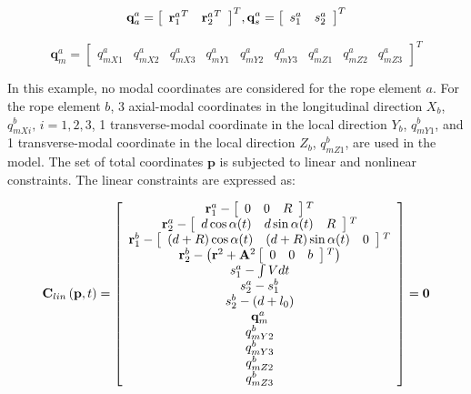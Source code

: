 \begin{equation}
  {\textbf{q}}_a^{a} = {\left[ {\begin{array}{*{20}{c}}{{{\bf{r}}_1^{a}}^T}&{{{\bf{r}}_2^{a}}^T} \end{array}} \right]^T},     {\bf{q}}_s^{a} = {\left[ {\begin{array}{*{20}{c}}{{s_1^a}}&{{s_2^a}}\end{array}} \right]^T}  
\end{equation}

\begin{equation}
    {\textbf{q}}_m^{a} = \left[ {\begin{array}{*{20}{c}}{{q_{mX1}^a}}&{{q_{mX2}^a}} &{{q_{mX3}^a}}&{{q_{mY1}^a}}&{{q_{mY2}^a}}& {{q_{mY3}^a}}&{{q_{mZ1}^a}}&{{q_{mZ2}^a}}& {{q_{mZ3}^a}}\end{array}} \right]^T 
\end{equation}

In this example, no modal coordinates are considered for the rope element $a$. For the rope element $b$, 3 axial-modal coordinates in the longitudinal direction $X_b$, $q_{mXi}^b,\, i = 1,2,3$, 1 transverse-modal coordinate in the local direction $Y_b$, $q_{mY1}^b$, and 1 transverse-modal coordinate in the local direction $Z_b$, $q_{mZ1}^b$, are used in the model. The set of total coordinates $\textbf{p}$ is subjected to linear and nonlinear constraints. The linear constraints are expressed as:

\begin{equation} \label{Clin_Elev}
{{\bf{C}}_{lin}}\left( {{\bf{p}},t} \right) = \left[ {\begin{array}{*{20}{c}}
{{\bf{r}}_1^a - \left[ {\begin{array}{*{20}{c}}
0&0&R
\end{array}} \right]{}^T}\\
{{\bf{r}}_2^a - \left[ {\begin{array}{*{20}{c}}
{d\cos \alpha (t)}&{d\sin \alpha (t)}&R
\end{array}} \right]{}^T}\\
{{\bf{r}}_1^b - \left[ {\begin{array}{*{20}{c}}
{\left( {d + R} \right)\cos \alpha (t)}&{\left( {d + R} \right)\sin \alpha (t)}&0
\end{array}} \right]{}^T}\\
{{\bf{r}}_2^b - \left( {{{\bf{r}}^2} + {{\bf{A}}^2}\left[ {\begin{array}{*{20}{c}}
0&0&b
\end{array}} \right]{}^T} \right)}\\
{s_1^a - \int {Vdt} }\\
{s_2^a - s_1^b}\\
{s_2^b - \left( {d + {l_0}} \right)}\\
{{\bf{q}}_m^a}\\
{q_{mY2}^b}\\
{q_{mY3}^b}\\
{q_{mZ2}^b}\\
{q_{mZ3}^b}
\end{array}} \right] = {\bf{0}}
\end{equation}

